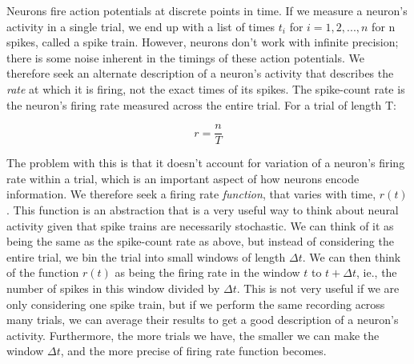 \documentclass{article}
\begin{document}
Neurons fire action potentials at discrete points in time. If we measure a neuron's activity in a single trial, we end up with a list of times $t_i$ for $i = 1,2,...,n$ for n spikes, called a spike train. However, neurons don't work with infinite precision; there is some noise inherent in the timings of these action potentials. We therefore seek an alternate description of a neuron's activity that describes the \textit{rate} at which it is firing, not the exact times of its spikes. The spike-count rate is the neuron's firing rate measured across the entire trial. For a trial of length T:

\begin{equation*}
	r = \frac{n}{T}
\end{equation*}

The problem with this is that it doesn't account for variation of a neuron's firing rate within a trial, which is an important aspect of how neurons encode information. We therefore seek a firing rate \textit{function}, that varies with time, $r(t)$. This function is an abstraction that is a very useful way to think about neural activity given that spike trains are necessarily stochastic. We can think of it as being the same as the spike-count rate as above, but instead of considering the entire trial, we bin the trial into small windows of length $\Delta t$. We can then think of the function $r(t)$ as being the firing rate in the window $t$ to $t+\Delta t$, ie., the number of spikes in this window divided by $\Delta t$. This is not very useful if we are only considering one spike train, but if we perform the same recording across many trials, we can average their results to get a good description of a neuron's activity. Furthermore, the more trials we have, the smaller we can make the window $\Delta t$, and the more precise of firing rate function becomes.\\

\begin{figure}[ht]
	\centering
\end{figure}
\end{document}
